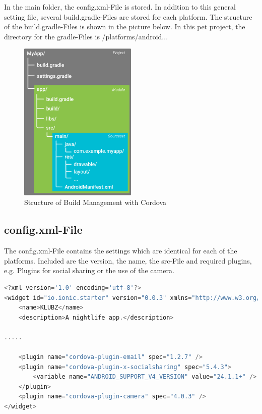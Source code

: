 \documentclass[12pt]{article}
\begin{document}
In the main folder, the config.xml-File is stored. In addition to this general setting file, several build.gradle-Files are stored for each platform. The structure of the build.gradle-Files is shown in the picture below. In this pet project, the directory for the gradle-Files is /platforms/android...
\begin{figure}[H]
  \centering
    \includegraphics[width=0.5\textwidth]{figures/gradle_files.png}
    \caption{Structure of Build Management with Cordova}
\end{figure}
\subsection{config.xml-File}

The config.xml-File contains the settings which are identical for each of the platforms.
Included are the version, the name, the src-File and required plugins, e.g. Plugins for social sharing or the use of the camera.

\begin{lstlisting}[language=javascript]
<?xml version='1.0' encoding='utf-8'?>
<widget id="io.ionic.starter" version="0.0.3" xmlns="http://www.w3.org/ns/widgets" xmlns:cdv="http://cordova.apache.org/ns/1.0">
    <name>KLUBZ</name>
    <description>A nightlife app.</description>
    
.....

	<plugin name="cordova-plugin-email" spec="1.2.7" />
    <plugin name="cordova-plugin-x-socialsharing" spec="5.4.3">
        <variable name="ANDROID_SUPPORT_V4_VERSION" value="24.1.1+" />
    </plugin>
    <plugin name="cordova-plugin-camera" spec="4.0.3" />
</widget>
\end{lstlisting}
\end{document}
